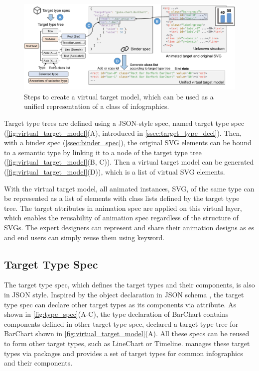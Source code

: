 \begin{figure}[h]
  \centering
  \includegraphics[width=\linewidth]{figs/target_workflow.pdf}
  \caption{Steps to create a virtual target model, which can be used as a unified representation of a class of infographics.}
  \label{fig:virtual_target_model}
\end{figure}

Target type trees are defined using a JSON-style spec, named target type spec (\autoref{fig:virtual_target_model}(A), introduced in \autoref{ssec:target_type_decl}).
Then, with a binder spec (\autoref{ssec:binder_spec}), the original SVG elements can be bound to a semantic type by linking it to a node of the target type tree (\autoref{fig:virtual_target_model}(B, C)).
Then a virtual target model can be generated (\autoref{fig:virtual_target_model}(D)), which is a list of virtual SVG elements.

With the virtual target model, all animated instances, \ie SVG, of the same type can be represented as a list of elements with class lists defined by the target type tree.
The target attributes in animation spec are applied on this virtual layer, which enables the reusability of animation spec regardless of the structure of SVGs.
The expert designers can represent and share their animation designs as \aniclass{}es and end users can simply reuse them using  keyword.

\subsection{Target Type Spec}
\label{ssec:target_type_decl}

The target type spec, which defines the target types and their components, is also in JSON style.
Inspired by the object declaration in JSON schema \cite{json-schema-org}, the target type spec can declare other target types as its components via  attribute.
As shown in \autoref{fig:type_spec}(A-C), the type declaration of BarChart contains components defined in other target type spec, declared a target type tree for BarChart shown in \autoref{fig:virtual_target_model}(A).
All these specs can be reused to form other target types, such as LineChart or Timeline.
\gaia{} manages these target types via packages and provides a set of target types for common infographics and their components.

